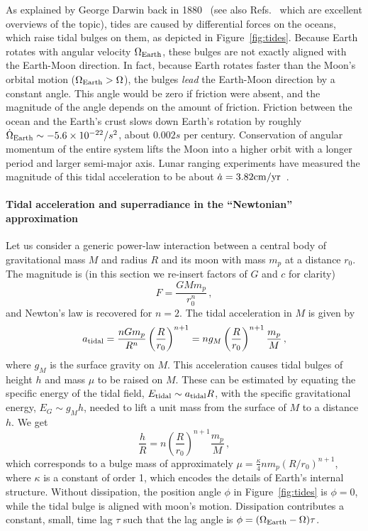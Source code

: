 \documentclass[11pt]{article}
\newcommand{\be}{\begin{equation}}
\newcommand{\ee}{\end{equation}}
\numberwithin{equation}{section} %
\begin{document}
As explained by George Darwin back in 1880~\cite{Darwin:1880} (see also Refs.~\cite{Hut:1981,Verbunt} which are excellent overviews of the topic), tides are caused by differential forces on the oceans, which raise tidal bulges on them, as depicted in Figure~\ref{fig:tides}.
Because Earth rotates with angular velocity $\Omega_{\rm Earth}$, these bulges are not exactly aligned with the Earth-Moon direction. In fact, because Earth rotates faster than the Moon's orbital motion ($\Omega_{\rm Earth}>\Omega$), the bulges {\it lead} the Earth-Moon direction by a constant angle. This angle would be zero if friction were absent, and the magnitude of the angle depends on the amount of friction. Friction between the ocean and the Earth's crust slows down Earth's rotation by roughly $\dot{\Omega}_{\rm Earth}\sim -5.6\times 10^{-22}/s^2$, about $0.002s$ per century. Conservation of angular momentum of the entire system lifts the Moon into a higher orbit with a longer period and larger semi-major axis. Lunar ranging experiments have measured the magnitude of this tidal acceleration to be about $\dot{a}=3.82 {\rm cm}/{\rm yr}$~\cite{Dickey:1994zz}. 




\paragraph{Tidal acceleration and superradiance in the ``Newtonian'' approximation}
Let us consider a generic power-law interaction between a central body of gravitational mass $M$ and radius $R$ and its moon with mass $m_p$ at a distance $r_0$. The magnitude is (in this section we re-insert factors of $G$ and $c$ for clarity)
%
\be
F=\frac{GMm_p}{r_0^{n}}\,, \label{NewtonGeneral}
\ee
%
and Newton's law is recovered for $n=2$. The tidal acceleration in $M$ is given by
%
\be
a_{\rm tidal}=\frac{nGm_p}{R^n}\left(\frac{R}{r_0}\right)^{n+1}=n g_M\left(\frac{R}{r_0}\right)^{n+1}\frac{m_p}{M}\,,
\ee
%
where $g_M$ is the surface gravity on $M$. This acceleration causes tidal bulges of height $h$ and mass $\mu$ to be raised on $M$. These can be estimated by equating the specific energy of the tidal field, $E_{\rm tidal}\sim a_{\rm tidal} R$, with the specific gravitational energy, $E_G\sim g_M h$, needed to lift a unit mass from the surface of $M$ to a distance $h$. We get
%
\be
\frac{h}{R}=n\left(\frac{R}{r_0}\right)^{n+1}\frac{m_p}{M}\,,
\ee
%
which corresponds to a bulge mass of approximately $\mu=\frac{\kappa}{4}n m_p \left({R}/{r_0}\right)^{n+1}$,
%
where $\kappa$ is a constant of order 1, which encodes the details of Earth's internal structure.
Without dissipation, the position angle $\phi$ in Figure~\ref{fig:tides} is $\phi=0$, while the tidal bulge is aligned with moon's motion. Dissipation contributes a constant, small, time lag $\tau$ such that the lag angle is $\phi=(\Omega_{\rm Earth}-\Omega)\tau$.
%
\end{document}
